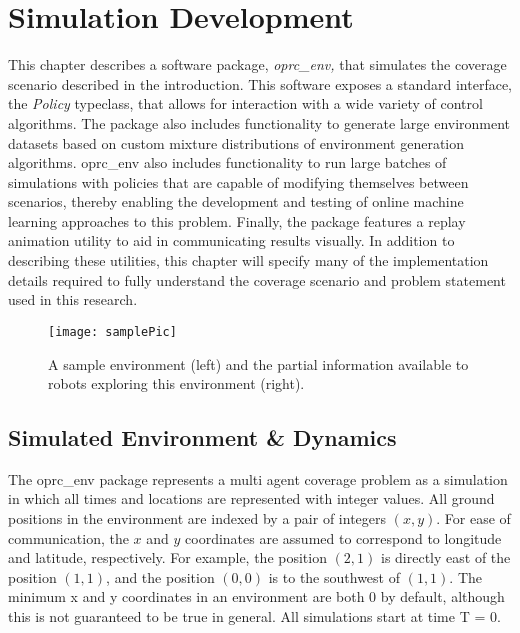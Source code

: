 \chapter{Simulation Development}

This chapter describes a software package, \textit{oprc\_env,} that simulates the coverage scenario described in the introduction. This software exposes a standard interface, the \textit{Policy} typeclass, that allows for interaction with a wide variety of control algorithms. The package also includes functionality to generate large environment datasets based on custom mixture distributions of environment generation algorithms. oprc\_env also includes functionality to run large batches of simulations with policies that are capable of modifying themselves between scenarios, thereby enabling the development and testing of online machine learning approaches to this problem. Finally, the package features a replay animation utility to aid in communicating results visually. In addition to describing these utilities, this chapter will specify many of the implementation details required to fully understand the coverage scenario and problem statement used in this research.


\begin{figure}[H]
\texttt{[image: samplePic]}
\caption[Sample Environment Visualization]{A sample environment (left) and the partial information available to robots exploring this environment (right).}
\label {fig:SampleViz}
\end{figure}

\section{Simulated Environment \& Dynamics}

The oprc\_env package represents a multi agent coverage problem as a simulation in which all times and locations are represented with integer values. All ground positions in the environment are indexed by a pair of integers $ (x, y) $. For ease of communication, the $x$ and $y$ coordinates are assumed to correspond to longitude and latitude, respectively. For example, the position $(2, 1)$ is directly east of the position $(1, 1)$, and the position $(0, 0)$ is to the southwest of $(1, 1)$. The minimum x and y coordinates in an environment are both 0 by default, although this is not guaranteed to be true in general. All simulations start at time T = 0.

